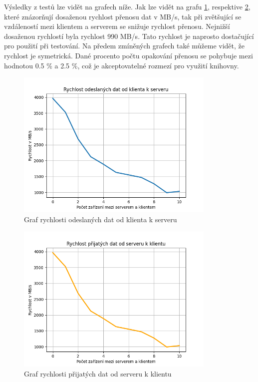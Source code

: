 Výsledky z testů lze vidět na grafech níže. Jak lze vidět na grafu \ref{fig:graph_send_speed}, respektive \ref{fig:graph_receive_speed}, které znázorňují dosaženou rychlost přenosu dat v MB/s, tak při zvětšující se vzdáleností mezi klientem a serverem se snižuje rychlost přenosu. Nejnižší dosaženou rychlostí byla rychlost 990 MB/s. Tato rychlost je naprosto dostačující pro použití při testování. Na předem zmíněných grafech také můžeme vidět, že rychlost je symetrická. Dané procento počtu opakování přenosu se pohybuje mezi hodnotou 0.5 \% a 2.5 \%, což je akceptovatelné rozmezí pro využití knihovny.

\clearpage

\begin{figure}[H]
    \centering 
    \includegraphics[width=0.85\textwidth]{assets/img/graphs/send_speed.png}
    \caption{Graf rychlosti odeslaných dat od klienta k serveru}
    \label{fig:graph_send_speed}
\end{figure}

\begin{figure}[H]
    \centering 
    \includegraphics[width=0.85\textwidth]{assets/img/graphs/receive_speed.png}
    \caption{Graf rychlosti přijatých dat od serveru k klientu}
    \label{fig:graph_receive_speed}
\end{figure}

